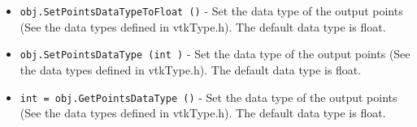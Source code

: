 \begin{itemize}
\item  \verb|obj.SetPointsDataTypeToFloat ()| -  Set the data type of the output points (See the data types defined in 
 vtkType.h). The default data type is float.

\item  \verb|obj.SetPointsDataType (int )| -  Set the data type of the output points (See the data types defined in 
 vtkType.h). The default data type is float.

\item  \verb|int = obj.GetPointsDataType ()| -  Set the data type of the output points (See the data types defined in 
 vtkType.h). The default data type is float.

\end{itemize}
